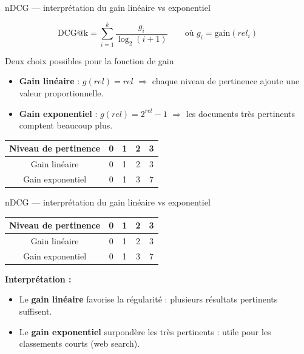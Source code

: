 \begin{frame}{nDCG — interprétation du gain linéaire vs exponentiel}

\[
\text{DCG@k} = \sum_{i=1}^k \frac{g_i}{\log_2(i+1)} \qquad 
\text{où } g_i = \text{gain}(rel_i)
\]

\begin{block}{Deux choix possibles pour la fonction de gain}
\begin{itemize}
    \item \textbf{Gain linéaire} : $g(rel) = rel$  
    $\Rightarrow$ chaque niveau de pertinence ajoute une valeur proportionnelle.
    \item \textbf{Gain exponentiel} : $g(rel) = 2^{rel}-1$  
    $\Rightarrow$ les documents très pertinents comptent beaucoup plus.
\end{itemize}
\end{block}

\begin{center}
\begin{tabular}{ccccc}
\toprule
Niveau de pertinence & 0 & 1 & 2 & 3 \\
\midrule
Gain linéaire & 0 & 1 & 2 & 3 \\
Gain exponentiel & 0 & 1 & 3 & 7 \\
\bottomrule
\end{tabular}
\end{center}
\end{frame}

\begin{frame}{nDCG — interprétation du gain linéaire vs exponentiel}
\begin{center}
\begin{tabular}{ccccc}
\toprule
Niveau de pertinence & 0 & 1 & 2 & 3 \\
\midrule
Gain linéaire & 0 & 1 & 2 & 3 \\
Gain exponentiel & 0 & 1 & 3 & 7 \\
\bottomrule
\end{tabular}
\end{center}
\vspace{0.5em}
\textbf{Interprétation :}
\begin{itemize}
  \item Le \textbf{gain linéaire} favorise la régularité : plusieurs résultats pertinents suffisent.
  \item Le \textbf{gain exponentiel} surpondère les très pertinents : utile pour les classements courts (web search).
\end{itemize}

\end{frame}
